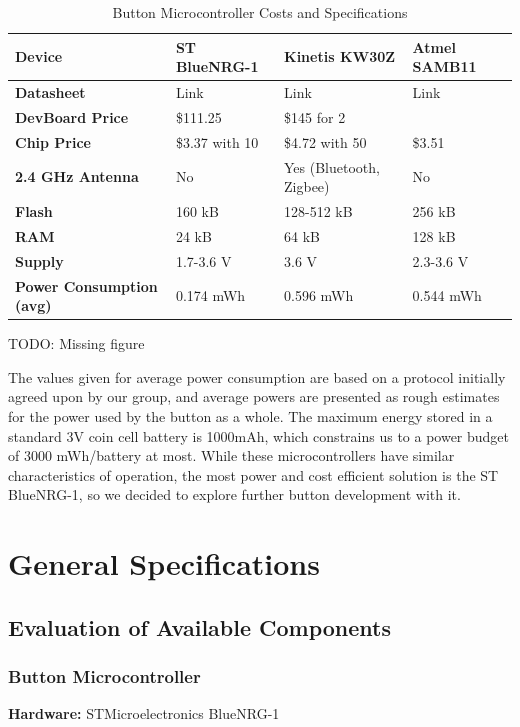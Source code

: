 \documentclass[journal,compsoc]{IEEEtran}
\begin{document}
\begin{table}[t]
  \centering
  \begin{tabular}{>{\bfseries}l|l l l}
    Device & ST BlueNRG-1 & Kinetis KW30Z & Atmel SAMB11 \\
    \hline
    Datasheet & Link & Link & Link \\
    DevBoard Price & \$111.25 & \$145 for 2 & \\
    Chip Price & \$3.37 with 10 & \$4.72 with 50 & \$3.51 \\
    2.4 GHz Antenna & No & Yes (Bluetooth, Zigbee) & No \\
    Flash & 160 kB & 128-512 kB & 256 kB \\
    RAM & 24 kB & 64 kB & 128 kB \\
    Supply & 1.7-3.6 V & 3.6 V & 2.3-3.6 V \\
    Power Consumption (avg) & 0.174 mWh & 0.596 mWh & 0.544 mWh
  \end{tabular}
  \caption{Button Microcontroller Costs and Specifications}
\end{table}

TODO: Missing figure

The values given for average power consumption are based on a protocol initially agreed upon by our group, and average powers are presented as rough estimates for the power used by the button as a whole.  The maximum energy stored in a standard 3V coin cell battery is 1000mAh, which constrains us to a power budget of 3000 mWh/battery at most.  While these microcontrollers have similar characteristics of operation, the most power and cost efficient solution is the ST BlueNRG-1, so we decided to explore further button development with it.

\section{General Specifications}

\subsection{Evaluation of Available Components}

\subsubsection{Button Microcontroller}

\textbf {Hardware:} STMicroelectronics BlueNRG-1
\end{document}

